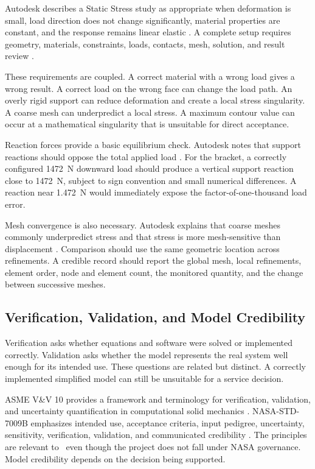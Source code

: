 Autodesk describes a Static Stress study as appropriate when deformation is
small, load direction does not change significantly, material properties are
constant, and the response remains linear elastic
\cite{autodeskStaticStress}. A complete setup requires geometry, materials,
constraints, loads, contacts, mesh, solution, and result review
\cite{autodeskStaticSetup}.

These requirements are coupled. A correct material with a wrong load gives a
wrong result. A correct load on the wrong face can change the load path. An
overly rigid support can reduce deformation and create a local stress
singularity. A coarse mesh can underpredict a local stress. A maximum contour
value can occur at a mathematical singularity that is unsuitable for direct
acceptance.

Reaction forces provide a basic equilibrium check. Autodesk notes that support
reactions should oppose the total applied load \cite{autodeskReaction}. For
the bracket, a correctly configured 1472~N downward load should produce a
vertical support reaction close to 1472~N, subject to sign convention and
small numerical differences. A reaction near 1.472~N would immediately expose
the factor-of-one-thousand load error.

Mesh convergence is also necessary. Autodesk explains that coarse meshes
commonly underpredict stress and that stress is more mesh-sensitive than
displacement \cite{autodeskMesh}. Comparison should use the same geometric
location across refinements. A credible record should report the global mesh,
local refinements, element order, node and element count, the monitored
quantity, and the change between successive meshes.

\subsection{Verification, Validation, and Model Credibility}
\label{sec:vv-review}

Verification asks whether equations and software were solved or implemented
correctly. Validation asks whether the model represents the real system well
enough for its intended use. These questions are related but distinct. A
correctly implemented simplified model can still be unsuitable for a service
decision.

ASME V\&V 10 provides a framework and terminology for verification,
validation, and uncertainty quantification in computational solid mechanics
\cite{asmeVV10}. NASA-STD-7009B emphasizes intended use, acceptance criteria,
input pedigree, uncertainty, sensitivity, verification, validation, and
communicated credibility \cite{nasa7009}. The principles are relevant to
\NEMO\ even though the project does not fall under NASA governance. Model
credibility depends on the decision being supported.

